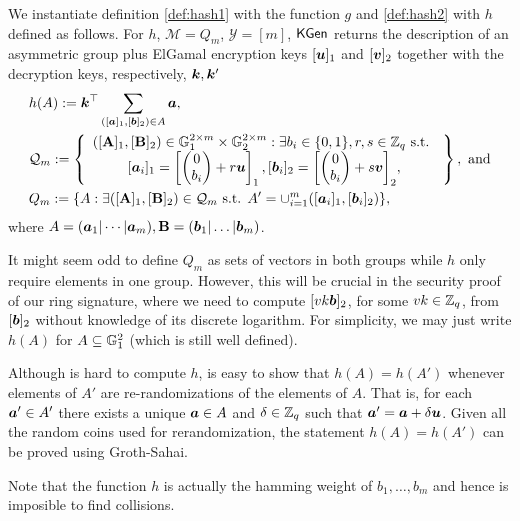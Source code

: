 
We instantiate definition \ref{def:hash1} with the function $g$ and \ref{def:hash2}  with $h$ defined as follows. For  $h$, $\mathcal{M}=Q_m$, $\mathcal{Y}=[m]$, $\mathsf{KGen}$ returns the description of an asymmetric group plus ElGamal encryption keys $[{\boldsymbol{u}}]_1$  and $[{\boldsymbol{v}}]_2$ together with the decryption keys, respectively, ${\boldsymbol{k}},{\boldsymbol{k}}'$ 
\begin{align*}
&h(A):= {\boldsymbol{k}}^\top\sum_{([{\boldsymbol{a}}]_1,[{\boldsymbol{b}}]_2)\in A}{\boldsymbol{a}},\\
&\mathcal{Q}_m := \left\{
\begin{array}{c}
([\mathbf{{A}}]_1,[\mathbf{{B}}]_2) \in \mathbb{G}_1^{2\times m}\times\mathbb{G}_2^{2\times m}:
\exists b_i \in\{0,1\},r,s\in\mathbb{Z}_q\text{ s.t. }\\
{[{\boldsymbol{a}}_i]_1 = \left[\left(\begin{matrix}0\\b_i\end{matrix}\right)+r{\boldsymbol{u}}\right]_1, [{\boldsymbol{b}}_i]_2 = \left[\left(\begin{matrix}0\\b_i\end{matrix}\right)+s{\boldsymbol{v}}\right]_2},
\end{array}\right\}, \text{ and}\\
&Q_m := \{A : \exists ([\mathbf{{A}}]_1,[\mathbf{{B}}]_2)\in\mathcal{Q}_m\text{ s.t. } A' = \cup_{i=1}^m([{\boldsymbol{a}}_i]_1,[{\boldsymbol{b}}_i]_2)\},
\end{align*}
 where $A=({\boldsymbol{a}}_1|\cdots|{\boldsymbol{a}}_m),\mathbf{{B}}=({\boldsymbol{b}}_1|\ldots|{\boldsymbol{b}}_m)$.

It might seem odd to define $Q_m$ as sets  of vectors in both groups while $h$ only require elements in one group. However, this will be crucial in the security proof of our ring signature, where we need to compute $[vk {\boldsymbol{b}}]_2$, for some $vk\in\mathbb{Z}_q$,
from  $[{\boldsymbol{b}}]_2$ without knowledge of its discrete logarithm. For simplicity, we may just write $h(A)$ for $A\subseteq \mathbb{G}_1^2$ (which is still well defined).

Although is hard to compute $h$, is easy to show that $h(A)=h(A')$ whenever elements of $A'$ are re-randomizations of the elements of $A$. That is, for each ${\boldsymbol{a}}'\in A'$ there exists a unique  ${\boldsymbol{a}}\in A$ and $\delta\in\mathbb{Z}_q$ such that ${\boldsymbol{a}}' = {\boldsymbol{a}}+\delta{\boldsymbol{u}}$. Given all the random coins used for rerandomization, the statement $h(A)=h(A')$ can be proved using Groth-Sahai.

Note that the function $h$ is actually the hamming weight of $b_1,\ldots,b_m$ and hence is imposible to find collisions.


